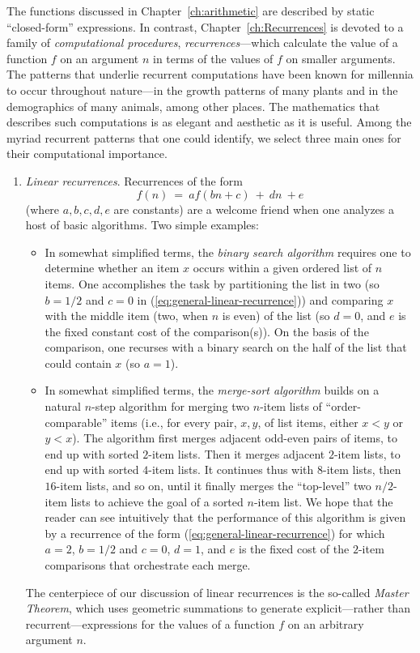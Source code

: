 The functions discussed in Chapter~\ref{ch:arithmetic} are described
by static ``closed-form'' expressions.  In contrast,
Chapter~\ref{ch:Recurrences} is devoted to a family of {\em
  computational procedures}, {\it recurrences}---which calculate the
value of a function $f$ on an argument $n$ in terms of the values of
$f$ on smaller arguments.  The patterns that underlie recurrent
computations have been known for millennia to occur throughout
nature---in the growth patterns of many plants and in the demographics
of many animals, among other places.  The mathematics that describes
such computations is as elegant and aesthetic as it is useful.  Among
the myriad recurrent patterns that one could identify, we select three
main ones for their computational importance.
\begin{enumerate}
\item
{\it Linear recurrences}.  Recurrences of the form
\begin{equation}
\label{eq:general-linear-recurrence}
f(n) \ = \ a f(bn+c) \ + \ dn \ + e
\end{equation}
(where $a, b, c, d, e$ are constants) are a welcome friend when one
analyzes a host of basic algorithms.  Two simple examples:
  \begin{itemize}
  \item
In somewhat simplified terms, the {\em binary search algorithm}
requires one to determine whether an item $x$ occurs within a given
ordered list of $n$ items.  One accomplishes the task by partitioning
the list in two (so $b = 1/2$ and $c = 0$ in
(\ref{eq:general-linear-recurrence})) and comparing $x$ with the
middle item (two, when $n$ is even) of the list (so $d = 0$, and $e$
is the fixed constant cost of the comparison(s)).  On the basis of the
comparison, one recurses with a binary search on the half of the list
that could contain $x$ (so $a = 1$).
  \item
In somewhat simplified terms, the {\em merge-sort algorithm} builds on
a natural $n$-step algorithm for merging two $n$-item lists of
``order-comparable'' items (i.e., for every pair, $x,y$, of list
items, either $x < y$ or $y < x$).  The algorithm first merges
adjacent odd-even pairs of items, to end up with sorted $2$-item
lists.  Then it merges adjacent $2$-item lists, to end up with sorted
$4$-item lists.  It continues thus with $8$-item lists, then $16$-item
lists, and so on, until it finally merges the ``top-level'' two
$n/2$-item lists to achieve the goal of a sorted $n$-item list.  We
hope that the reader can see intuitively that the performance of this
algorithm is given by a recurrence of the form
(\ref{eq:general-linear-recurrence}) for which $a=2$, $b = 1/2$ and $c
= 0$, $d=1$, and $e$ is the fixed cost of the $2$-item comparisons that
orchestrate each merge.
  \end{itemize}
The centerpiece of our discussion of linear recurrences is the
so-called {\em Master Theorem}, which uses geometric summations to
generate explicit---rather than recurrent---expressions for the values
of a function $f$ on an arbitrary argument $n$.


\end{enumerate}
